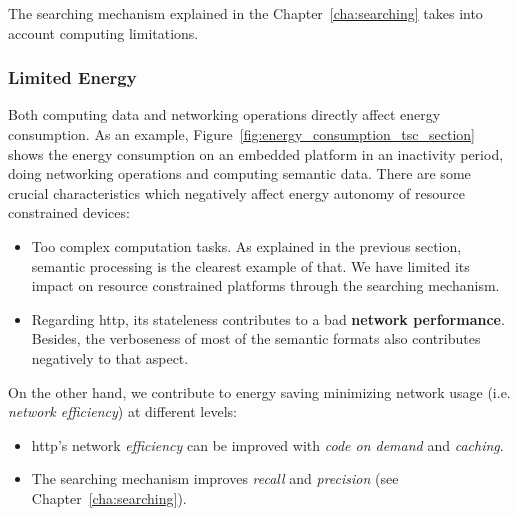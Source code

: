 The searching mechanism explained in the Chapter~\ref{cha:searching} takes into account computing limitations.



\subsubsection{Limited Energy}

Both computing data and networking operations directly affect energy consumption.
As an example, Figure~\ref{fig:energy_consumption_tsc_section} shows the energy consumption on an embedded platform in an inactivity period, doing networking operations and computing semantic data. %
There are some crucial characteristics which negatively affect energy autonomy of resource constrained devices:
\begin{itemize}
  \item Too complex computation tasks.
        As explained in the previous section, semantic processing is the clearest example of that.
        We have limited its impact on resource constrained platforms through the searching mechanism.
  \item Regarding \ac{http}, its stateleness contributes to a bad \textbf{network performance}.
        Besides, the verboseness of most of the semantic formats also contributes negatively to that aspect.
\end{itemize}




On the other hand, we contribute to energy saving minimizing network usage (i.e. \emph{network efficiency}) at different levels:
\begin{itemize}
  \item \ac{http}'s network \emph{efficiency} can be improved with \emph{code on demand} and \emph{caching}.
  \item The searching mechanism improves \emph{recall} and \emph{precision} (see Chapter~\ref{cha:searching}).
\end{itemize}



